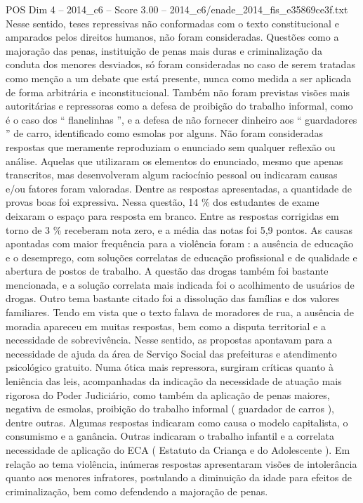 \begin{textsample}{POS Dim 4 – 2014\_c6 – Score 3.00 – 2014\_c6/enade\_2014\_fis\_e35869ce3f.txt}
Nesse sentido, teses repressivas não conformadas com o texto constitucional e amparados pelos direitos humanos, não foram consideradas.
Questões como a majoração das penas, instituição de penas mais duras e criminalização da conduta dos menores desviados, só foram consideradas no caso de serem tratadas como menção a um debate que está presente, nunca como medida a ser aplicada de forma arbitrária e inconstitucional.
Também não foram previstas visões mais autoritárias e repressoras como a defesa de proibição do trabalho informal, como é o caso dos “ flanelinhas ”, e a defesa de não fornecer dinheiro aos “ guardadores ” de carro, identificado como esmolas por alguns.
Não foram consideradas respostas que meramente reproduziam o enunciado sem qualquer reflexão ou análise.
Aquelas que utilizaram os elementos do enunciado, mesmo que apenas transcritos, mas desenvolveram algum raciocínio pessoal ou indicaram causas e/ou fatores foram valoradas.
Dentre as respostas apresentadas, a quantidade de provas boas foi expressiva.
Nessa questão, 14 \% dos estudantes de exame deixaram o espaço para resposta em branco.
Entre as respostas corrigidas em torno de 3 \% receberam nota zero, e a média das notas foi 5,9 pontos.
As causas apontadas com maior frequência para a violência foram : a ausência de educação e o desemprego, com soluções correlatas de educação profissional e de qualidade e abertura de postos de trabalho.
A questão das drogas também foi bastante mencionada, e a solução correlata mais indicada foi o acolhimento de usuários de drogas.
Outro tema bastante citado foi a dissolução das famílias e dos valores familiares.
Tendo em vista que o texto falava de moradores de rua, a ausência de moradia apareceu em muitas respostas, bem como a disputa territorial e a necessidade de sobrevivência.
Nesse sentido, as propostas apontavam para a necessidade de ajuda da área de Serviço Social das prefeituras e atendimento psicológico gratuito.
Numa ótica mais repressora, surgiram críticas quanto à leniência das leis, acompanhadas da indicação da necessidade de atuação mais rigorosa do Poder Judiciário, como também da aplicação de penas maiores, negativa de esmolas, proibição do trabalho informal ( guardador de carros ), dentre outras.
Algumas respostas indicaram como causa o modelo capitalista, o consumismo e a ganância.
Outras indicaram o trabalho infantil e a correlata necessidade de aplicação do ECA ( Estatuto da Criança e do Adolescente ).
Em relação ao tema violência, inúmeras respostas apresentaram visões de intolerância quanto aos menores infratores, postulando a diminuição da idade para efeitos de criminalização, bem como defendendo a majoração de penas.

\end{textsample}
